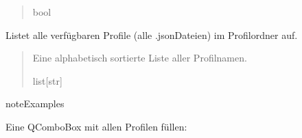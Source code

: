 \documentclass[letterpaper,10pt,english]{sphinxmanual}
\begin{document}
\begin{fulllineitems}
\begin{fulllineitems}
\begin{quote}
\begin{description}
\begin{description}
\end{description}


\sphinxAtStartPar
bool

\end{description}\end{quote}

\end{fulllineitems}


\begin{fulllineitems}
\label{\detokenize{modulab/profile_manager:modules.profile.ProfileManager.ProfileManager.list_profiles}}
\pysigstartsignatures
\pysiglinewithargsret
{}
{}
{}
\pysigstopsignatures
\sphinxAtStartPar
Listet alle verfügbaren Profile (alle .json\sphinxhyphen{}Dateien) im Profilordner auf.
\begin{quote}\begin{description}
\sphinxAtStartPar
Eine alphabetisch sortierte Liste aller Profilnamen.

\sphinxAtStartPar
list{[}str{]}

\end{description}\end{quote}

\begin{sphinxadmonition}{note}{Examples}

\sphinxAtStartPar
Eine QComboBox mit allen Profilen füllen:

\begin{sphinxVerbatim}[commandchars=\\\{\}]
  
\end{sphinxVerbatim}
\end{sphinxadmonition}

\end{fulllineitems}



\end{fulllineitems}
\end{document}
